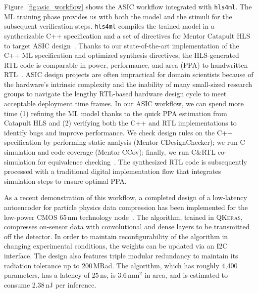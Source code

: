 \documentclass[sigconf]{acmart}
\newcommand{\hlsfml}{\texttt{hls4ml}\xspace}
\begin{document}
Figure~\ref{fig:asic_workflow} shows the ASIC workflow integrated with \hlsfml.
The ML training phase provides us with both the model and the stimuli for the subsequent verification steps. 
\hlsfml compiles the trained model in a synthesizable \textsc{C++} specification and a set of directives for Mentor Catapult HLS to target ASIC design~\cite{catapulthls2020}.
Thanks to our state-of-the-art implementation of the \textsc{C++} ML specification and optimized synthesis directives, the HLS-generated RTL code is comparable in power, performance, and area (PPA) to handwritten RTL~\cite{khailany2018modular}.
ASIC design projects are often impractical for domain scientists because of the hardware's intrinsic complexity and the inability of many small-sized research groups to navigate the lengthy RTL-based hardware design cycle to meet acceptable deployment time frames.
In our ASIC workflow, we can spend more time (1) refining the ML model thanks to the quick PPA estimation from Catapult HLS and (2) verifying both the \textsc{C++} and RTL implementations to identify bugs and improve performance. 
We check design rules on the \textsc{C++} specification by performing static analysis (Mentor CDesignChecker); we run \textsc{C} simulation and code coverage (Mentor CCov); finally, we run \textsc{C}\&RTL co-simulation for equivalence checking~\cite{hlsverific2020}. 
The synthesized RTL code is subsequently processed with a traditional digital implementation flow that integrates simulation steps to ensure optimal PPA.

As a recent demonstration of this workflow, a completed design of a low-latency autoencoder for particle physics data compression has been implemented for the low-power CMOS 65\,nm technology node~\cite{ieee_nss_talk_1_2020,ieee_nss_talk_2_2020}.  
The algorithm, trained in \textsc{QKeras}, compresses on-sensor data with convolutional and dense layers to be transmitted off the detector.  
In order to maintain reconfigurability of the algorithm in changing experimental conditions, the weights can be updated via an I2C interface.
The design also features triple modular redundancy to maintain its radiation tolerance up to 200\,MRad. 
The algorithm, which has roughly 4,400 parameters, has a latency of 25\,ns, is 3.6\,mm$^2$ in area, and is estimated to consume 2.38\,nJ per inference.  

\end{document}

